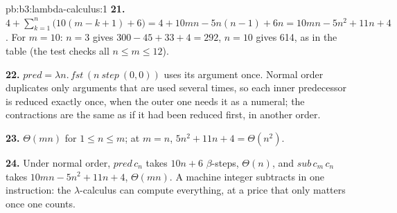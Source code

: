 \begin{solution}{pb:b3:lambda-calculus:1}
\textbf{21.} $4 + \sum_{k=1}^{n} \bigl(10(m - k + 1) + 6\bigr) = 4 + 10mn - 5n(n - 1) + 6n = 10mn - 5n^2 + 11n + 4$. For $m = 10$: $n = 3$ gives $300 - 45 + 33 + 4 = 292$, $n = 10$ gives 614, as in the table (the test checks all $n \le m \le 12$).

\textbf{22.} $\mathit{pred} = \lambda n.\,\mathit{fst}\,(n\ \mathit{step}\ (0, 0))$ uses its argument once. Normal order duplicates only arguments that are used several times, so each inner predecessor is reduced exactly once, when the outer one needs it as a numeral; the contractions are the same as if it had been reduced first, in another order.

\textbf{23.} $\Theta(mn)$ for $1 \le n \le m$; at $m = n$, $5n^2 + 11n + 4 = \Theta(n^2)$.

\textbf{24.} Under normal order, $\mathit{pred}\,c_n$ takes $10n + 6$ $\beta$-steps, $\Theta(n)$, and $\mathit{sub}\,c_m\,c_n$ takes $10mn - 5n^2 + 11n + 4$, $\Theta(mn)$. A machine integer subtracts in one instruction: the $\lambda$-calculus can compute everything, at a price that only matters once one counts.
\end{solution}

